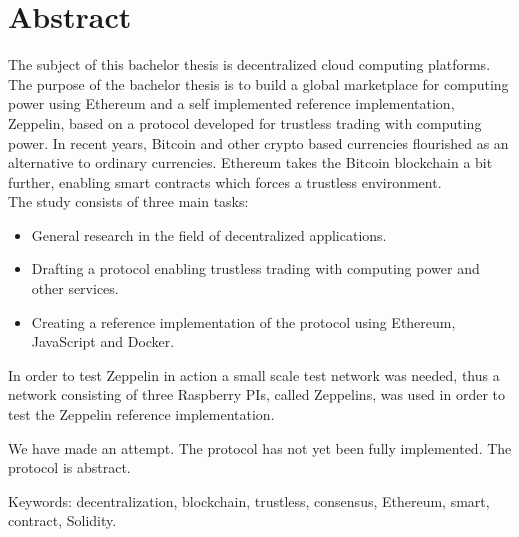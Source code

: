 
\thispagestyle{plain}			%
\section*{Abstract}
The subject of this bachelor thesis is decentralized cloud computing platforms. The purpose of the bachelor thesis is to build a global marketplace for computing power using Ethereum and a self implemented reference implementation, Zeppelin, based on a protocol developed for trustless trading with computing power. In recent years, Bitcoin and other crypto based currencies flourished as an alternative to ordinary currencies. Ethereum takes the Bitcoin blockchain a bit further, enabling smart contracts which forces a trustless environment. \\ \newline
The study consists of three main tasks: 
\begin{itemize}
\item General research in the field of decentralized applications.
\item Drafting a protocol enabling trustless trading with computing power and other services.
\item Creating a reference implementation of the protocol using Ethereum, JavaScript and Docker.\newline
\end{itemize}
In order to test Zeppelin in action a small scale test network was needed, thus a network consisting of three Raspberry PIs, called Zeppelins, was used in order to test the Zeppelin reference implementation. 

We have made an attempt. The protocol has not yet been fully implemented. The protocol is abstract.

\vfill
\noindent Keywords: decentralization, blockchain, trustless, consensus, Ethereum, smart, contract, Solidity.

\newpage				%
\thispagestyle{empty}
\mbox{}
